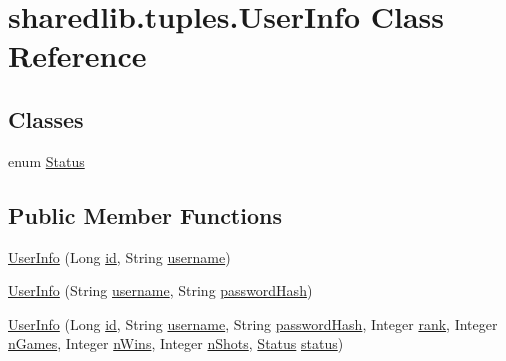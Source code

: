 \hypertarget{classsharedlib_1_1tuples_1_1_user_info}{}\section{sharedlib.\+tuples.\+User\+Info Class Reference}
\label{classsharedlib_1_1tuples_1_1_user_info}
\subsection*{Classes}
\begin{DoxyCompactItemize}
\item 
enum \hyperlink{enumsharedlib_1_1tuples_1_1_user_info_1_1_status}{Status}
\end{DoxyCompactItemize}
\subsection*{Public Member Functions}
\begin{DoxyCompactItemize}
\item 
\hyperlink{classsharedlib_1_1tuples_1_1_user_info_a94efc532e161e878597b0dabe15fc945}{User\+Info} (Long \hyperlink{classsharedlib_1_1tuples_1_1_user_info_a718f94d7bb86f3c19dd7ae911b4dfca3}{id}, String \hyperlink{classsharedlib_1_1tuples_1_1_user_info_ae2aece1a833e9963fa7dc508992d4cf0}{username})
\item 
\hyperlink{classsharedlib_1_1tuples_1_1_user_info_a1c4c22e7bcb44e71b4f096a99cb8586b}{User\+Info} (String \hyperlink{classsharedlib_1_1tuples_1_1_user_info_ae2aece1a833e9963fa7dc508992d4cf0}{username}, String \hyperlink{classsharedlib_1_1tuples_1_1_user_info_ac680e59ba2bbe5e5c754977c393729da}{password\+Hash})
\item 
\hyperlink{classsharedlib_1_1tuples_1_1_user_info_aa67b1ad5c5fef64f0ae7a8a459a3cec9}{User\+Info} (Long \hyperlink{classsharedlib_1_1tuples_1_1_user_info_a718f94d7bb86f3c19dd7ae911b4dfca3}{id}, String \hyperlink{classsharedlib_1_1tuples_1_1_user_info_ae2aece1a833e9963fa7dc508992d4cf0}{username}, String \hyperlink{classsharedlib_1_1tuples_1_1_user_info_ac680e59ba2bbe5e5c754977c393729da}{password\+Hash}, Integer \hyperlink{classsharedlib_1_1tuples_1_1_user_info_acc55d52c1e93fbdc544907692ab5a45c}{rank}, Integer \hyperlink{classsharedlib_1_1tuples_1_1_user_info_aed7cc749f766225615c61ae3d22063d9}{n\+Games}, Integer \hyperlink{classsharedlib_1_1tuples_1_1_user_info_ab74910b9bc813f5090314372da220c04}{n\+Wins}, Integer \hyperlink{classsharedlib_1_1tuples_1_1_user_info_aaafc1c84d64409331d72709349653130}{n\+Shots}, \hyperlink{enumsharedlib_1_1tuples_1_1_user_info_1_1_status}{Status} \hyperlink{classsharedlib_1_1tuples_1_1_user_info_a2122f345a07ca469c305e79827797563}{status})
\end{DoxyCompactItemize}
